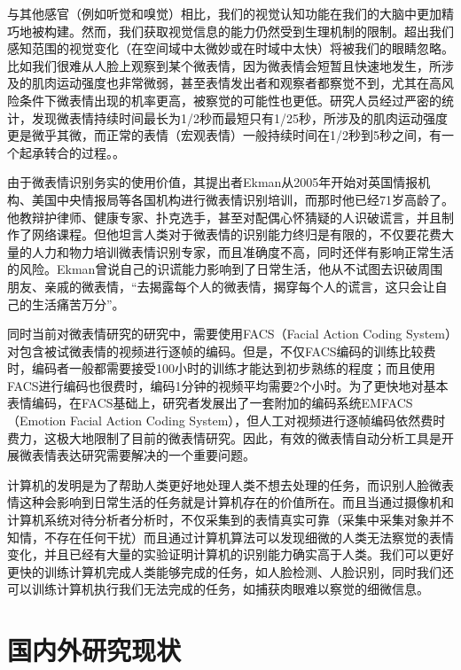 与其他感官（例如听觉和嗅觉）相比，我们的视觉认知功能在我们的大脑中更加精巧地被构建。然而，我们获取视觉信息的能力仍然受到生理机制的限制。超出我们感知范围的视觉变化（在空间域中太微妙或在时域中太快）将被我们的眼睛忽略。比如我们很难从人脸上观察到某个微表情，因为微表情会短暂且快速地发生，所涉及的肌肉运动强度也非常微弱，甚至表情发出者和观察者都察觉不到，尤其在高风险条件下微表情出现的机率更高，被察觉的可能性也更低。研究人员经过严密的统计，发现微表情持续时间最长为1/2秒而最短只有1/25秒，所涉及的肌肉运动强度更是微乎其微，而正常的表情（宏观表情）一般持续时间在1/2秒到5秒之间，有一个起承转合的过程。\citep{Yan2013How, matsumoto2011evidence, Porter2008Reading}。

由于微表情识别务实的使用价值，其提出者Ekman从2005年开始对英国情报机构、美国中央情报局等各国机构进行微表情识别培训，而那时他已经71岁高龄了\citep{Lie2010to}。他教辩护律师、健康专家、扑克选手，甚至对配偶心怀猜疑的人识破谎言，并且制作了网络课程。但他坦言人类对于微表情的识别能力终归是有限的，不仅要花费大量的人力和物力培训微表情识别专家，而且准确度不高，同时还伴有影响正常生活的风险\citep{Ekman2010A}。Ekman曾说自己的识谎能力影响到了日常生活，他从不试图去识破周围朋友、亲戚的微表情，“去揭露每个人的微表情，揭穿每个人的谎言，这只会让自己的生活痛苦万分”。

同时当前对微表情研究的研究中，需要使用FACS（Facial Action Coding System）对包含被试微表情的视频进行逐帧的编码\citep{ekman1978facial}。但是，不仅FACS编码的训练比较费时，编码者一般都需要接受100小时的训练才能达到初步熟练的程度；而且使用FACS进行编码也很费时，编码1分钟的视频平均需要2个小时\citep{Maja2009Machine}。为了更快地对基本表情编码，在FACS基础上，研究者发展出了一套附加的编码系统EMFACS（Emotion Facial Action Coding System），但人工对视频进行逐帧编码依然费时费力，这极大地限制了目前的微表情研究。因此，有效的微表情自动分析工具是开展微表情表达研究需要解决的一个重要问题。

计算机的发明是为了帮助人类更好地处理人类不想去处理的任务，而识别人脸微表情这种会影响到日常生活的任务就是计算机存在的价值所在。而且当通过摄像机和计算机系统对待分析者分析时，不仅采集到的表情真实可靠（采集中采集对象并不知情，不存在任何干扰）而且通过计算机算法可以发现细微的人类无法察觉的表情变化，并且已经有大量的实验证明计算机的识别能力确实高于人类\citep{Li2017Towards}。我们可以更好更快的训练计算机完成人类能够完成的任务，如人脸检测、人脸识别，同时我们还可以训练计算机执行我们无法完成的任务，如捕获肉眼难以察觉的细微信息\citep{Doctoral2017Li}。

\section{国内外研究现状}\label{sec:system}

